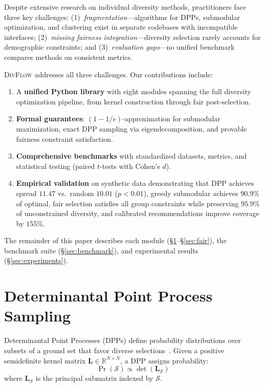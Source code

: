 \documentclass[11pt]{article}
\begin{document}
Despite extensive research on individual diversity methods, practitioners face
three key challenges: (1)~\emph{fragmentation}---algorithms for DPPs,
submodular optimization, and clustering exist in separate codebases with
incompatible interfaces; (2)~\emph{missing fairness integration}---diversity
selection rarely accounts for demographic constraints; and
(3)~\emph{evaluation gaps}---no unified benchmark compares methods on
consistent metrics.

\textsc{DivFlow} addresses all three challenges. Our contributions include:

\begin{enumerate}[leftmargin=*]
\item A \textbf{unified Python library} with eight modules spanning the full
  diversity optimization pipeline, from kernel construction through fair
  post-selection.
\item \textbf{Formal guarantees}: $(1-1/e)$-approximation for submodular
  maximization, exact DPP sampling via eigendecomposition, and provable
  fairness constraint satisfaction.
\item \textbf{Comprehensive benchmarks} with standardized datasets, metrics,
  and statistical testing (paired $t$-tests with Cohen's $d$).
\item \textbf{Empirical validation} on synthetic data demonstrating that
  DPP achieves spread $11.47$ vs.\ random $10.01$ ($p < 0.01$), greedy
  submodular achieves $90.9\%$ of optimal, fair selection satisfies all group
  constraints while preserving $95.9\%$ of unconstrained diversity, and
  calibrated recommendations improve coverage by $155\%$.
\end{enumerate}

The remainder of this paper describes each module
(\S\ref{sec:dpp}--\S\ref{sec:fair}), the benchmark suite
(\S\ref{sec:benchmark}), and experimental results (\S\ref{sec:experiments}).

\section{Determinantal Point Process Sampling}
\label{sec:dpp}

Determinantal Point Processes (DPPs) define probability distributions over
subsets of a ground set that favor diverse
selections~\citep{kulesza2012determinantal}. Given a positive semidefinite
kernel matrix $\mathbf{L} \in \mathbb{R}^{N \times N}$, a DPP assigns
probability:
\begin{equation}
\Pr(\mathcal{S}) \propto \det(\mathbf{L}_\mathcal{S})
\label{eq:dpp-prob}
\end{equation}
where $\mathbf{L}_\mathcal{S}$ is the principal submatrix indexed by
$\mathcal{S}$.
\end{document}
